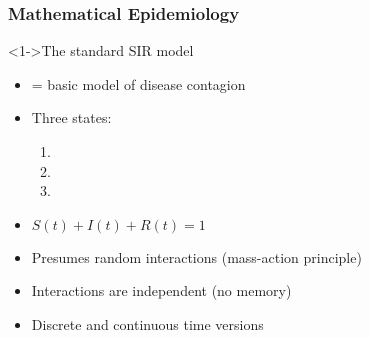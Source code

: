 

\begin{frame}
  \frametitle{Mathematical Epidemiology}

  \begin{block}<1->{The standard \alert{SIR model}\cite{murray2002a}}
    \begin{itemize}
    \item<2-> = basic model of disease contagion
    \item<3-> Three states:
      \begin{enumerate}
      \item<4-> 
      \item<5-> 
      \item<6-> 
      \end{enumerate}
      \item<8-> $S(t) + I(t) + R(t) = 1$
      \item<9-> Presumes random interactions (mass-action principle)
      \item<10-> Interactions are independent (no memory)
      \item<11-> Discrete and continuous time versions
    \end{itemize}
  \end{block}

\end{frame}


